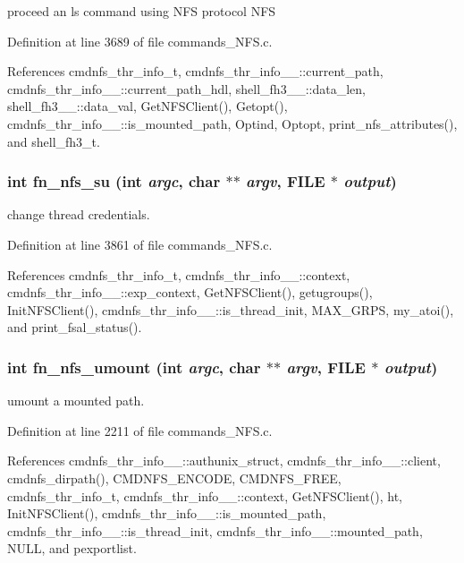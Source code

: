 proceed an ls command using NFS protocol NFS 

Definition at line 3689 of file commands\_\-NFS.c.

References cmdnfs\_\-thr\_\-info\_\-t, cmdnfs\_\-thr\_\-info\_\-\_\-::current\_\-path, cmdnfs\_\-thr\_\-info\_\-\_\-::current\_\-path\_\-hdl, shell\_\-fh3\_\-\_\-::data\_\-len, shell\_\-fh3\_\-\_\-::data\_\-val, Get\-NFSClient(), Getopt(), cmdnfs\_\-thr\_\-info\_\-\_\-::is\_\-mounted\_\-path, Optind, Optopt, print\_\-nfs\_\-attributes(), and shell\_\-fh3\_\-t.
\subsubsection{\setlength{\rightskip}{0pt plus 5cm}int fn\_\-nfs\_\-su (int {\em argc}, char $\ast$$\ast$ {\em argv}, FILE $\ast$ {\em output})}\label{commands_8h_a78}


change thread credentials. 

Definition at line 3861 of file commands\_\-NFS.c.

References cmdnfs\_\-thr\_\-info\_\-t, cmdnfs\_\-thr\_\-info\_\-\_\-::context, cmdnfs\_\-thr\_\-info\_\-\_\-::exp\_\-context, Get\-NFSClient(), getugroups(), Init\-NFSClient(), cmdnfs\_\-thr\_\-info\_\-\_\-::is\_\-thread\_\-init, MAX\_\-GRPS, my\_\-atoi(), and print\_\-fsal\_\-status().
\subsubsection{\setlength{\rightskip}{0pt plus 5cm}int fn\_\-nfs\_\-umount (int {\em argc}, char $\ast$$\ast$ {\em argv}, FILE $\ast$ {\em output})}\label{commands_8h_a68}


umount a mounted path. 

Definition at line 2211 of file commands\_\-NFS.c.

References cmdnfs\_\-thr\_\-info\_\-\_\-::authunix\_\-struct, cmdnfs\_\-thr\_\-info\_\-\_\-::client, cmdnfs\_\-dirpath(), CMDNFS\_\-ENCODE, CMDNFS\_\-FREE, cmdnfs\_\-thr\_\-info\_\-t, cmdnfs\_\-thr\_\-info\_\-\_\-::context, Get\-NFSClient(), ht, Init\-NFSClient(), cmdnfs\_\-thr\_\-info\_\-\_\-::is\_\-mounted\_\-path, cmdnfs\_\-thr\_\-info\_\-\_\-::is\_\-thread\_\-init, cmdnfs\_\-thr\_\-info\_\-\_\-::mounted\_\-path, NULL, and pexportlist.
